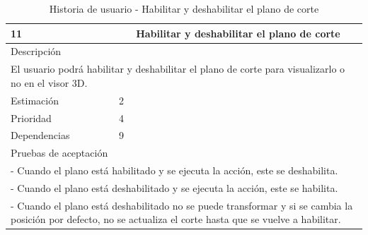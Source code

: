 \begin{table}[H]
	\begin{center}
		\begin{tabular} {|l|c|l|}
			\hline
			11 & \multicolumn{2}{c|}{Habilitar y deshabilitar el plano de corte} \\ \hline \hline
			\multicolumn{3}{|l|}{Descripción} \\ \hline
			\multicolumn{3}{|p{12cm}|}{El usuario podrá habilitar y deshabilitar el plano de corte para visualizarlo o no en el visor 3D.} \\ \hline
			\multicolumn{2}{|l|}{Estimación} & 2 \\ \hline
			\multicolumn{2}{|l|}{Prioridad} & 4 \\ \hline
			\multicolumn{2}{|l|}{Dependencias} & 9 \\ \hline
			\multicolumn{3}{|l|}{Pruebas de aceptación} \\ \hline
			\multicolumn{3}{|p{12cm}|}{ - Cuando el plano está habilitado y se ejecuta la acción, este se deshabilita.} \\
			\multicolumn{3}{|p{12cm}|}{ - Cuando el plano está deshabilitado y se ejecuta la acción, este se habilita.} \\ 
			\multicolumn{3}{|p{12cm}|}{ - Cuando el plano está deshabilitado no se puede transformar y si se cambia la posición por defecto, no se actualiza el corte hasta que se vuelve a habilitar.} \\ \hline
		\end{tabular}
	\end{center}
	\caption{Historia de usuario - Habilitar y deshabilitar el plano de corte}
	\label{tab:hu_habilitar_y_deshabilitar_el_plano_de_corte}
\end{table}

